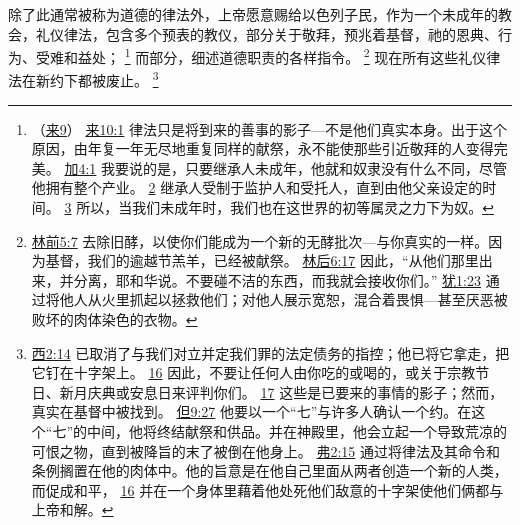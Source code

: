 \documentclass[12pt, a4paper, oneside]{ctexart}
\newcounter{parnum}[section]
\newcommand{\N}{%
   \noindent\refstepcounter{parnum}%
    \makebox[\parindent][l]{\textbf{\arabic{parnum}.}}}
\begin{document}
\N 除了此通常被称为道德的律法外，上帝愿意赐给以色列子民，作为一个未成年的教会，礼仪律法，包含多个预表的教仪，部分关于敬拜，预兆着基督，祂的恩典、行为、受难和益处；
	\footnote {
		（\href{https://biblehub.com/niv/hebrews/9.htm}{来9}）
		\href{https://biblehub.com/hebrews/10-1.htm}{来10:1} 律法只是将到来的善事的影子---不是他们真实本身。出于这个原因，由年复一年无尽地重复同样的献祭，永不能使那些引近敬拜的人变得完美。
		\href{https://biblehub.com/galatians/4-1.htm}{加4:1} 我要说的是，只要继承人未成年，他就和奴隶没有什么不同，尽管他拥有整个产业。
		\href{https://biblehub.com/galatians/4-2.htm}{2} 继承人受制于监护人和受托人，直到由他父亲设定的时间。
		\href{https://biblehub.com/galatians/4-3.htm}{3} 所以，当我们未成年时，我们也在这世界的初等属灵之力下为奴。
	}
	而部分，细述道德职责的各样指令。
	\footnote {
		\href{https://biblehub.com/1_corinthians/5-7.htm}{林前5:7} 去除旧酵，以使你们能成为一个新的无酵批次---与你真实的一样。因为基督，我们的逾越节羔羊，已经被献祭。
		\href{https://biblehub.com/2_corinthians/6-17.htm}{林后6:17} 因此，“从他们那里出来，并分离，耶和华说。不要碰不洁的东西，而我就会接收你们。”
		\href{https://biblehub.com/jude/1-23.htm}{犹1:23} 通过将他人从火里抓起以拯救他们；对他人展示宽恕，混合着畏惧---甚至厌恶被败坏的肉体染色的衣物。
	}
	现在所有这些礼仪律法在新约下都被废止。
	\footnote {
		\href{https://biblehub.com/colossians/2-14.htm}{西2:14} 已取消了与我们对立并定我们罪的法定债务的指控；他已将它拿走，把它钉在十字架上。
		\href{https://biblehub.com/colossians/2-16.htm}{16} 因此，不要让任何人由你吃的或喝的，或关于宗教节日、新月庆典或安息日来评判你们。
		\href{https://biblehub.com/colossians/2-17.htm}{17} 这些是已要来的事情的影子；然而，真实在基督中被找到。
		\href{https://biblehub.com/daniel/9-27.htm}{但9:27} 他要以一个“七”与许多人确认一个约。在这个“七”的中间，他将终结献祭和供品。并在神殿里，他会立起一个导致荒凉的可恨之物，直到被降旨的末了被倒在他身上。
		\href{https://biblehub.com/ephesians/2-15.htm}{弗2:15} 通过将律法及其命令和条例搁置在他的肉体中。他的旨意是在他自己里面从两者创造一个新的人类，而促成和平，
		\href{https://biblehub.com/ephesians/2-16.htm}{16} 并在一个身体里藉着他处死他们敌意的十字架使他们俩都与上帝和解。
	}
\end{document}
